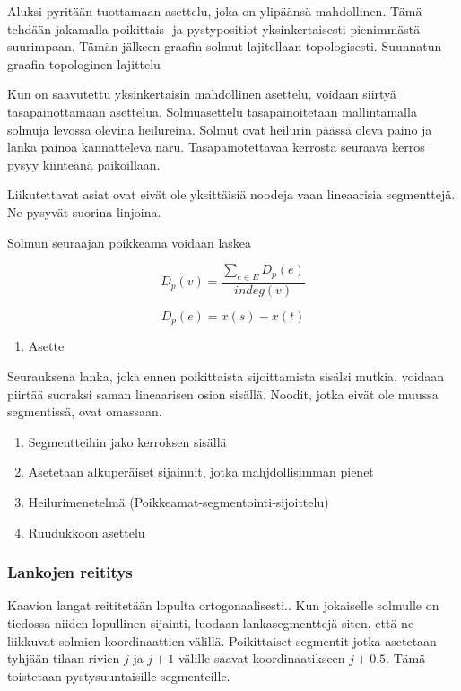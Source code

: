\documentclass[finnish,12pt]{article}
\begin{document}
Aluksi pyritään tuottamaan asettelu, joka on ylipäänsä mahdollinen.
Tämä tehdään jakamalla poikittais- ja pystypositiot yksinkertaisesti pienimmästä suurimpaan.
Tämän jälkeen graafin solmut lajitellaan topologisesti.
Suunnatun graafin topologinen lajittelu

Kun on saavutettu yksinkertaisin mahdollinen asettelu, voidaan siirtyä tasapainottamaan asettelua.
Solmuasettelu tasapainoitetaan mallintamalla solmuja levossa olevina heilureina.
Solmut ovat heilurin päässä oleva paino ja lanka painoa kannatteleva naru.
Tasapainotettavaa kerrosta seuraava kerros pysyy kiinteänä paikoillaan.

Liikutettavat asiat ovat eivät ole yksittäisiä noodeja vaan lineaarisia segmenttejä.
Ne pysyvät suorina linjoina.

Solmun seuraajan poikkeama voidaan laskea 

$$
D_p(v)=\frac{\sum_{e \in E}D_p(e)}{indeg(v)}
$$

$$
D_p(e) = x(s) - x(t)
$$


\begin{enumerate}
	\item Asette\end{enumerate}

Seurauksena lanka, joka ennen poikittaista sijoittamista sisälsi mutkia, voidaan piirtää suoraksi saman lineaarisen osion sisällä.
Noodit, jotka eivät ole muussa segmentissä, ovat omassaan.

\begin{enumerate}
	\item Segmentteihin jako kerroksen sisällä
	\item Asetetaan alkuperäiset sijainnit, jotka mahjdollisimman pienet
	\item Heilurimenetelmä (Poikkeamat-segmentointi-sijoittelu)
	\item Ruudukkoon asettelu
\end{enumerate}


\cite{RefWorks:49}


		\subsubsection{Lankojen reititys}


Kaavion langat reititetään lopulta ortogonaalisesti..\cite{RefWorks:17}
Kun jokaiselle solmulle on tiedossa niiden lopullinen sijainti, luodaan lankasegmenttejä siten, että ne liikkuvat solmien koordinaattien välillä.
Poikittaiset segmentit jotka asetetaan tyhjään tilaan rivien $j$ ja $j+1$ välille saavat koordinaatikseen $j+0.5$.
Tämä toistetaan pystysuuntaisille segmenteille.
\end{document}
